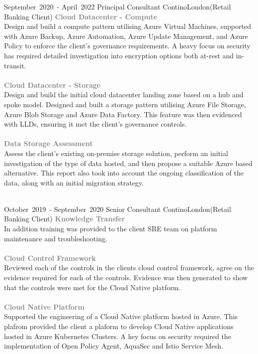 \cventry %
  {\mbox{September 2020 -} \mbox{April 2022}}
  {Principal Consultant}
  {Contino}{London}{(Retail Banking Client)}
  { 
    \textcolor{gray}{\textbf{Cloud Datacenter - Compute}}\\ 
    Design and build a compute pattern utilising Azure Virtual Machines, 
    supported with Azure Backup, Azure Automation, Azure Update Management,
    and Azure Policy to enforce the client's governance requirements.
    A heavy focus on security has required detailed investigation into 
    encryption options both at-rest and in-transit.\\\\
    \textcolor{gray}{\textbf{Cloud Datacenter - Storage}}\\ 
    Design and build the initial cloud datacenter landing zone based on
    a hub and spoke model. Designed and built a storage pattern utilising
    Azure File Storage, Azure Blob Storage and Azure Data Factory. This 
    feature was then evidenced with LLDs, ensuring it met the client's 
    governance controls.\\\\
    \textcolor{gray}{\textbf{Data Storage Assessment}}\\ 
    Assess the client's existing on-premise storage solution, perform
    an initial investigation of the type of data hosted, and then
    propose a suitable Azure based alternative. This report also took
    into account the ongoing classification of the data, along with 
    an initial migration strategy.\\\\
  }

\cventry %
  {\mbox{October 2019 -} \mbox{September 2020}}
  {Senior Consultant}
  {Contino}{London}{(Retail Banking Client)}
  {
    \textcolor{gray}{\textbf{Knowledge Transfer}}\\
    In addition training was provided
    to the client SRE team on platform maintenance and troubleshooting.\\\\
    \textcolor{gray}{\textbf{Cloud Control Framework}}\\
    Reviewed each of the controls in the clients cloud control framework, 
    agree on the evidence required for each of the controls. 
    Evidence was then generated to show that the controls were met for the 
    Cloud Native platform.\\\\
    \textcolor{gray}{\textbf{Cloud Native Platform}}\\
    Supported the engineering of a Cloud Native platform hosted in Azure. 
    This plafrom provided the client a plaform to develop Cloud Native applications
    hosted in Azure Kubernetes Clusters. A key focus on security required the implementation
    of Open Policy Agent, AquaSec and Istio Service Mesh.\\
  }

